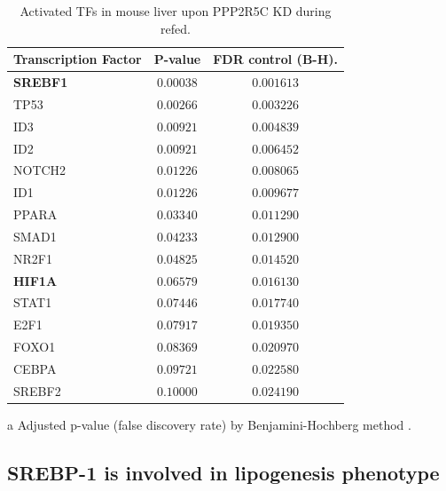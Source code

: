 \begin{table}[htbp]
\begin{center}
\begin{threeparttable}
\caption{Activated TFs in mouse liver upon PPP2R5C KD during refed.}
\label{tab:tab2.1}
\begin{footnotesize}
\begin{tabular}{lcc}
\toprule
\multicolumn{1}{c}{Transcription Factor}&\multicolumn{1}{c}{P-value}&\multicolumn{1}{c}{FDR control (B-H)\tnote{a}.}\tabularnewline
\midrule
\textbf{SREBF1}&$0.00038$&$0.001613$\tabularnewline
TP53&$0.00266$&$0.003226$\tabularnewline
ID3&$0.00921$&$0.004839$\tabularnewline
ID2&$0.00921$&$0.006452$\tabularnewline
NOTCH2&$0.01226$&$0.008065$\tabularnewline
ID1&$0.01226$&$0.009677$\tabularnewline
PPARA&$0.03340$&$0.011290$\tabularnewline
SMAD1&$0.04233$&$0.012900$\tabularnewline
NR2F1&$0.04825$&$0.014520$\tabularnewline
\textbf{HIF1A}&$0.06579$&$0.016130$\tabularnewline
STAT1&$0.07446$&$0.017740$\tabularnewline
E2F1&$0.07917$&$0.019350$\tabularnewline
FOXO1&$0.08369$&$0.020970$\tabularnewline
CEBPA&$0.09721$&$0.022580$\tabularnewline
SREBF2&$0.10000$&$0.024190$\tabularnewline
\bottomrule
\end{tabular}
\end{footnotesize}
\begin{tablenotes}  
\item[a] \scriptsize{Adjusted p-value (false discovery rate) by Benjamini-Hochberg method  \cite{benjamini_controlling_1995}}.
\end{tablenotes}
\end{threeparttable}
\end{center}
\end{table}


\subsection{SREBP-1 is involved in lipogenesis phenotype}

